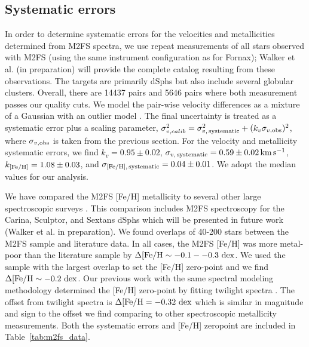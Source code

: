 \documentclass[twocolumn]{aastex63}
\begin{document}
\subsection{Systematic errors}
In order to determine systematic errors for the velocities and metallicities determined from M2FS spectra, we use repeat measurements of all stars observed with M2FS (using the same instrument configuration as for Fornax); Walker et al. (in preparation) will provide the complete catalog resulting from these observations.    The targets are primarily dSphs but also include several globular clusters. 
Overall, there are 14437 pairs and 5646 pairs where both measurement passes our quality cuts. 
We model the pair-wise velocity differences  as a mixture of a Gaussian with an outlier model \citep[Section 4.1 of][]{Li2019MNRAS.490.3508L}.
The final uncertainty is treated as a systematic error plus a scaling parameter, $\sigma_{v, calib}^2 = \sigma_{v, \, {\rm systematic}}^2 + (k_v \sigma_{v, {\rm obs}})^2$, where $\sigma_{v, {\rm obs}}$ is taken from the previous section.
For the velocity and metallicity systematic errors, we find $k_v=0.95 \pm 0.02$, $\sigma_{v, \, {\rm systematic}}=0.59\pm0.02 \mathrm{\,km} \mathrm{\,s}^{-1}$,  $k_{\rm [Fe/H]}=1.08\pm0.03$, and $\sigma_{{\rm [Fe/H]}, \, {\rm systematic}}=0.04\pm0.01$. 
We adopt the median values for our analysis.

We have compared the M2FS [Fe/H] metallicity to several other large spectroscopic surveys  \citep{Battaglia2006A&A...459..423B, Kirby2010ApJS..191..352K, Letarte2010A&A...523A..17L, Lemasle2012A&A...538A.100L, Hill2019A&A...626A..15H, Hendricks2014A&A...572A..82H, Theler2020A&A...642A.176T}.  This comparison  includes M2FS spectroscopy for the Carina, Sculptor, and Sextans dSphs which will be presented in future work  (Walker et al. in preparation). 
We found overlaps of 40-200 stars between the M2FS sample and literature data. In all cases, the M2FS [Fe/H] was  more metal-poor than the literature sample by $\Delta {\rm [Fe/H} \sim -0.1- -0.3~{\rm dex}$. 
We used the sample with the  largest overlap \citep{Kirby2010ApJS..191..352K} to set the [Fe/H] zero-point  and we  find $\Delta {\rm [Fe/H} \sim -0.2~{\rm dex}$.
Our previous work with the same spectral modeling methodology  determined the [Fe/H] zero-point by fitting twilight spectra \citep{Walker2015MNRAS.448.2717W,Walker2015ApJ...808..108W,
Walker2016ApJ...819...53W}. The offset from twilight spectra is $\Delta {\rm [Fe/H} = -0.32~{\rm dex}$  which is similar in magnitude and sign to the offset we find comparing to other spectroscopic metallicity measurements.
Both the systematic errors and [Fe/H] zeropoint are included in Table~\ref{tab:m2fs_data}.
\end{document}
